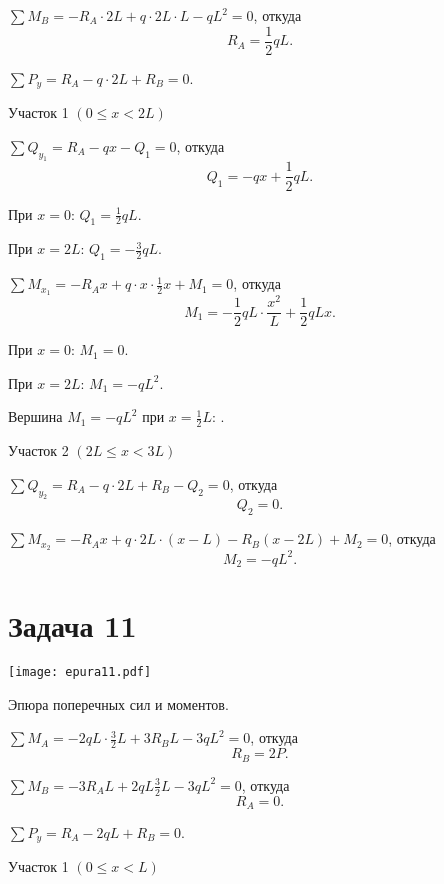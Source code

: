 $\sum M_B = -R_A \cdot 2L + q \cdot 2L \cdot L - qL^2 = 0$,
откуда
\[
    R_A = \frac{1}{2}qL.
\]

$\sum P_y = R_A - q \cdot 2L + R_B = 0$.

\vspace{1.5ex}

Участок 1 $\left(0 \le x < 2L\right)$

$\sum Q_{y_1} = R_A - qx - Q_1 = 0$,
откуда
\[
    Q_1 = -qx + \frac{1}{2}qL.
\]

При $x = 0$: $Q_1 = \frac{1}{2}qL$.

При $x = 2L$: $Q_1 = -\frac{3}{2}qL$.

$\sum M_{x_1} = -R_A x + q \cdot x \cdot \frac{1}{2}x + M_1 = 0$,
откуда
\[
    M_1 = -\frac{1}{2}qL \cdot \frac{x^2}{L} + \frac{1}{2}qLx.
\]

При $x = 0$: $M_1 = 0$.

При $x = 2L$: $M_1 = -qL^2$.

Вершина $M_1 = -qL^2$ при $x = \frac{1}{2} L$: .

\vspace{1.5ex}

Участок 2 $\left(2L \le x < 3L\right)$

$\sum Q_{y_2} = R_A - q \cdot 2L + R_B - Q_2 = 0$,
откуда
\[
    Q_2 = 0.
\]

$\sum M_{x_2} = -R_A x + q \cdot 2L \cdot (x - L) - R_B (x - 2L) + M_2 = 0$,
откуда
\[
    M_2 = -qL^2.
\]

\newpage


\section{Задача 11}

\begin{floatingfigure}[r]{0.5\textwidth}
    \centering
    \texttt{[image: epura11.pdf]}
    \caption{Эпюра поперечных сил и моментов.}
    \label{fig:chap1-epura11}
\end{floatingfigure}

$\sum M_A = -2 q L \cdot \frac{3}{2} L + 3 R_B L - 3qL^2 = 0$,
откуда
\[
    R_B = 2P.
\]

$\sum M_B = -3 R_A L + 2 q L \frac{3}{2} L - 3 q L^2 = 0$,
откуда
\[
    R_A = 0.
\]

$\sum P_y = R_A - 2 q L + R_B = 0$.

\vspace{1.5ex}

Участок 1 $\left(0 \le x < L\right)$

